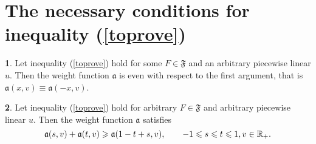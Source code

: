 \section{The necessary conditions for inequality (\ref{toprove})}

\begin{thm}
\label{necessary}
{\bf 1}. Let inequality (\ref{toprove}) hold for some $F \in \mathfrak {F}$
and an arbitrary piecewise linear $u$. Then the weight function $\mathfrak a$ is even with respect to the first argument,
that is $\mathfrak a(x, v) \equiv \mathfrak a(-x, v)$.

{\bf 2}. Let inequality (\ref{toprove}) hold for arbitrary $F \in \mathfrak{F}$
and arbitrary piecewise linear $u$. Then the weight function $\mathfrak a$ satisfies
\begin{equation}
\label{almostConcave}
\mathfrak a(s, v) + \mathfrak a(t, v) \ge \mathfrak a(1 - t + s, v), \qquad -1 \le s \le t \le 1, v \in \Real_+.
\end{equation}
\end{thm}

